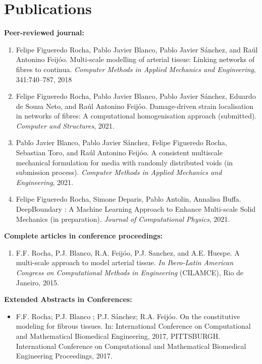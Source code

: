 \documentclass[letterpaper]{twentysecondcv} %
\begin{document}
\section{Publications}
\item \textbf{Peer-reviewed journal:}
\begin{enumerate}
\item Felipe Figueredo Rocha, Pablo Javier Blanco, Pablo Javier Sánchez, and Raúl Antonino Feijóo. Multi-scale modelling of arterial tissue: Linking networks of fibres to continua. \textit{Computer Methods in Applied Mechanics and Engineering}, 341:740–787, 2018
\item Felipe Figueredo Rocha, Pablo Javier Blanco, Pablo Javier Sánchez, Eduardo de Souza Neto, and Raúl Antonino Feijóo. Damage-driven strain localisation in networks of fibres: A computational homogenisation approach (submitted). \textit{Computer and Structures}, 2021.
\item Pablo Javier Blanco, Pablo Javier Sánchez, Felipe Figueredo Rocha, Sebastian Toro, and Raúl Antonino Feijóo. A consistent multiscale mechanical formulation for media with randomly distributed voids (in submission process). \textit{Computer Methods in Applied Mechanics and Engineering}, 2021.
\item Felipe Figueredo Rocha, Simone Deparis, Pablo Antolin, Annalisa Buffa. DeepBoundary : A Machine Learning Approach to Enhance Multi-scale  Solid Mechanics (in preparation). \textit{Journal of Computational Physics}, 2021.

\end{enumerate}	
\vskip -0.1cm
\item \textbf{Complete articles in conference proceedings:} 
\begin{enumerate}
	\item F.F. Rocha, P.J. Blanco, R.A. Feijóo, P.J. Sanchez, and A.E. Huespe. A multi-scale approach to model arterial tissue. \textit{In Ibero-Latin American Congress on Computational Methods in Engineering} (CILAMCE), Rio
	de Janeiro, 2015.
\end{enumerate}	
\vskip -0.1cm
\item \textbf{Extended Abstracts in Conferences:}
\begin{itemize}
\item F.F. Rocha; P.J. Blanco ; P.J. Sánchez; R.A. Feijóo. On the constitutive modeling for fibrous tissues. In: International Conference on Computational and Mathematical Biomedical Engineering, 2017, PITTSBURGH. International Conference on Computational and Mathematical Biomedical Engineering Proceedings, 2017.
\end{itemize}
\end{document}
